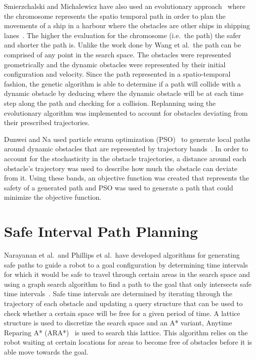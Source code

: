 Smierzchalski and Michalewicz have also used an evolutionary
approach~\cite{evosurvey} where the chromosome represents the spatio temporal
path in order to plan the movements of a ship in a harbour where the obstacles
are other ships in shipping lanes~\cite{smierzchalski2005path}. The higher the
evaluation for the chromosome (i.e.\ the path) the safer and shorter the path
is. Unlike the work done by Wang et al.\ the path can be comprised of any point
in the search space.  The obstacles were represented geometrically and the
dynamic obstacles were represented by their initial configuration and velocity.
Since the path represented in a spatio-temporal fashion, the genetic algorithm
is able to determine if a path will collide with a dynamic obstacle by deducing
where the dynamic obstacle will be at each time step along the path and
checking for a collision.  Replanning using the evolutionary algorithm was
implemented to account for obstacles deviating from their prescribed
trajectories.

Dunwei and Na used particle swarm optimization (PSO)~\cite{kennedy2010particle}
to generate local paths around dynamic obstacles that are represented by
trajectory bands~\cite{dunwei2011local}.  In order to account for the
stochasticity in the obstacle trajectories, a distance around each obstacle's
trajectory was used to describe how much the obstacle can deviate from it.
Using these bands, an objective function was created that represents the safety
of a generated path and PSO was used to generate a path that could minimize the
objective function.

\section{Safe Interval Path Planning}

Narayanan et al.\ and Phillips et al.\ have developed algorithms for generating
safe paths to guide a robot to a goal configuration by determining time
intervals for which it would be safe to travel through certain areas in the
search space and using a graph search algorithm to find a path to the goal that
only intersects safe time intervals~\cite{asipp, sipp}.  Safe time intervals
are determined by iterating through the trajectory of each obstacle and
updating a query structure that can be used to check whether a certain space
will be free for a given period of time. A lattice structure is used to
discretize the search space and an A* variant, Anytime Reparing A*
(ARA*)~\cite{likhachev2003ara} is used to search this lattice. This algorithm
relies on the robot waiting at certain locations for areas to become free of
obstacles before it is able move towards the goal.

